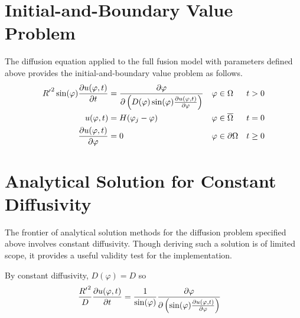 \documentclass{report}
\newcommand\Par[1]{{ \left({#1}\right) }}
\newcommand\R{{ R' }}
\begin{document}
\section{Initial-and-Boundary Value Problem}
The diffusion equation applied to the full fusion model with parameters defined above provides the initial-and-boundary value problem as follows.
\begin{align*}
	\R^2 \sin(\varphi) \pdv{u(\varphi, t)}{t} &= \pdv\varphi\Par{D(\varphi) \sin(\varphi) \pdv{u(\varphi, t)}{\varphi}}
	& \varphi &\in \Omega
	& t &> 0 \\
	u(\varphi, t) &= H(\varphi_j - \varphi)
	& \varphi &\in \overline\Omega
	& t &= 0 \\
	\pdv{u(\varphi, t)}{\varphi} &= 0 & \varphi &\in \partial\Omega & t &\geq 0
\end{align*}

\section{Analytical Solution for Constant Diffusivity}
The frontier of analytical solution methods for the diffusion problem specified above involves constant diffusivity. Though deriving such a solution is of limited scope, it provides a useful validity test for the implementation.

By constant diffusivity, $D(\varphi) = D$ so
\begin{align*}
	\frac{\R^2}{D} \pdv{u(\varphi, t)}{t} &= \frac{1}{\sin(\varphi)}\pdv\varphi\Par{\sin(\varphi) \pdv{u(\varphi, t)}{\varphi}}
\end{align*}
\end{document}
